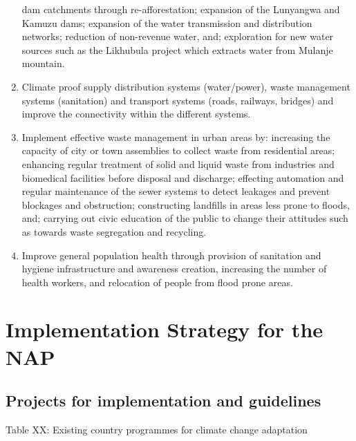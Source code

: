 \documentclass[
]{book}
\begin{document}
\begin{enumerate}
  dam catchments through re-afforestation; expansion of the Lunyangwa and Kamuzu dams; expansion of the water transmission and distribution networks; reduction
  of non-revenue water, and; exploration for new water sources such as the Likhubula project which extracts water from Mulanje mountain.
\item
  Climate proof supply distribution systems (water/power), waste management systems (sanitation) and transport systems (roads, railways, bridges) and improve
  the connectivity within the different systems.
\item
  Implement effective waste management in urban areas by: increasing the capacity of city or town assemblies to collect waste from residential areas; enhancing
  regular treatment of solid and liquid waste from industries and biomedical facilities before disposal and discharge; effecting automation and regular maintenance
  of the sewer systems to detect leakages and prevent blockages and obstruction; constructing landfills in areas less prone to floods, and; carrying out civic
  education of the public to change their attitudes such as towards waste segregation and recycling.
\item
  Improve general population health through provision of sanitation and hygiene infrastructure and awareness creation, increasing the number of health workers,
  and relocation of people from flood prone areas.
\end{enumerate}

\hypertarget{implementation-strategy-for-the-nap}{%
\chapter{Implementation Strategy for the NAP}\label{implementation-strategy-for-the-nap}}

\hypertarget{projects-for-implementation-and-guidelines}{%
\section{Projects for implementation and guidelines}\label{projects-for-implementation-and-guidelines}}

Table XX: Existing country programmes for climate change adaptation
\end{document}
